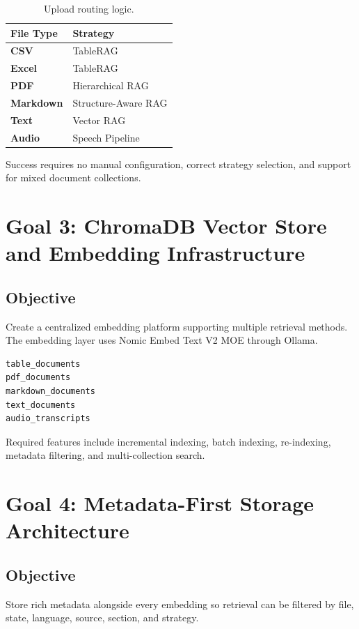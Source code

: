 \documentclass[11pt]{article}
\begin{document}
\begin{table}[h]
\centering
\begin{tabularx}{0.76\textwidth}{>{\bfseries}lY}
\toprule
File Type & Strategy \\
\midrule
CSV & TableRAG \\
Excel & TableRAG \\
PDF & Hierarchical RAG \\
Markdown & Structure-Aware RAG \\
Text & Vector RAG \\
Audio & Speech Pipeline \\
\bottomrule
\end{tabularx}
\caption{Upload routing logic.}
\end{table}

Success requires no manual configuration, correct strategy selection, and support for
mixed document collections.

\section{Goal 3: ChromaDB Vector Store and Embedding Infrastructure}

\subsection{Objective}
Create a centralized embedding platform supporting multiple retrieval methods. The
embedding layer uses Nomic Embed Text V2 MOE through Ollama.

\begin{lstlisting}[caption={ChromaDB collections.}]
table_documents
pdf_documents
markdown_documents
text_documents
audio_transcripts
\end{lstlisting}

Required features include incremental indexing, batch indexing, re-indexing, metadata
filtering, and multi-collection search.

\section{Goal 4: Metadata-First Storage Architecture}

\subsection{Objective}
Store rich metadata alongside every embedding so retrieval can be filtered by file,
state, language, source, section, and strategy.
\end{document}
